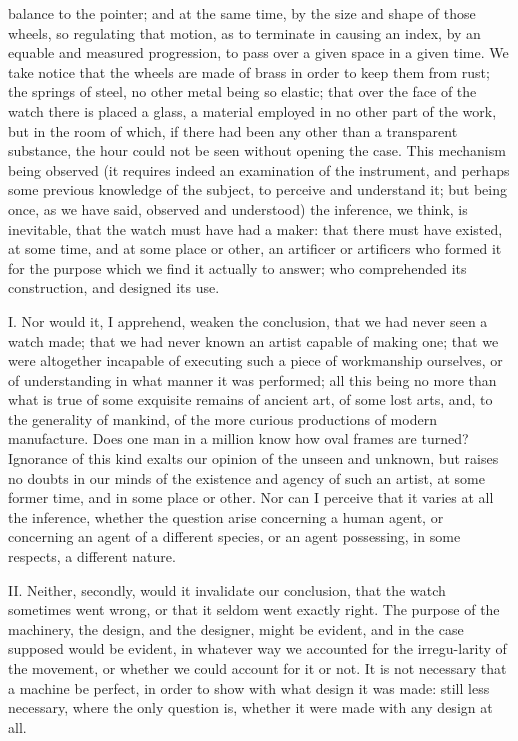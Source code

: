 balance to the pointer; and at the same time, by the  size and
shape of those wheels, so regulating that motion, as to terminate in
causing an index, by an equable and measured progression, to pass over
a given space in a given time. We take notice that the wheels are
made of brass in order to keep them from rust; the springs of steel,
no other metal being so elastic; that over the face of the watch there
is placed a glass, a material employed in no other part of the work,
but in the room of which, if there had been any other than a
transparent substance, the hour could not be seen without opening the
case. This mechanism being observed (it requires indeed an examination
of the instrument, and perhaps some previous knowledge of the subject,
to perceive and understand it; but being once, as we have said,
observed and understood) the inference, we think, is inevitable, that
the watch must have had a maker: that there must have existed, at some
time, and at some place or other, an artificer or artificers who
formed it for the purpose which we find it actually to answer; who
comprehended its construction, and designed its use.

I. Nor would it, I apprehend, weaken the conclusion, that we had never
seen a watch made; that we had never known an artist  capable
of making one; that we were altogether incapable of executing such a
piece of workmanship ourselves, or of understanding in what manner it
was performed; all this being no more than what is true of some
exquisite remains of ancient art, of some lost arts, and, to the
generality of mankind, of the more curious productions of modern
manufacture. Does one man in a million know how oval frames are
turned? Ignorance of this kind exalts our opinion of the unseen and
unknown, but raises no doubts in our minds of the existence and agency
of such an artist, at some former time, and in some place or other.
Nor can I perceive that it varies at all the inference, whether the
question arise concerning a human agent, or concerning an agent of a
different species, or an agent possessing, in some respects, a
different nature.

II. Neither, secondly, would it invalidate our conclusion, that the
watch sometimes went wrong, or that it seldom went exactly right. The
purpose of the machinery, the design, and the designer, might be
evident, and in the case supposed would be evident, in whatever way we
accounted for the irregu-larity of the movement, or whether we
could account for it or not. It is not necessary that a machine be
perfect, in order to show with what design it was made: still less
necessary, where the only question is, whether it were made with any
design at all.

